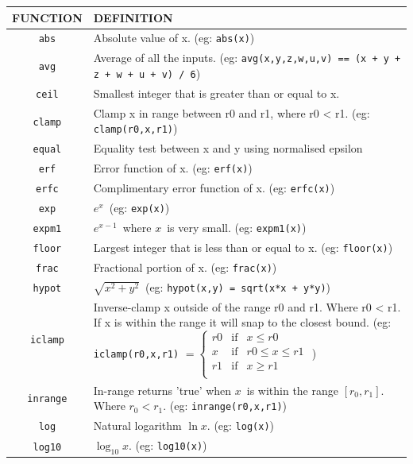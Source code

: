 \documentclass{book}
\begin{document}
{\newpage\clearpage
{}%
\begin{tabular}{|c|p{}|}
\hline
FUNCTION & DEFINITION\\
\hline
\verb'abs'& Absolute value of x.  (eg: \verb'abs(x)')\\
\verb'avg'& Average of all the inputs. (eg: \verb'avg(x,y,z,w,u,v) == (x + y + z + w + u + v) / 6')\\
\verb'ceil'& Smallest integer that is greater than or equal to x.\\
\verb'clamp'& Clamp x in range between r0 and r1, where r0 < r1. (eg:
\verb'clamp(r0,x,r1)')\\
\verb'equal'& Equality test between x and y using normalised epsilon\\
\verb'erf'& Error function of x.  (eg: \verb'erf(x)')\\
\verb'erfc'& Complimentary error function of x.  (eg: \verb'erfc(x)')\\
\verb'exp'& $e^x$\   (eg: \verb'exp(x)')\\
\verb'expm1'& $e^{x-1}$\  where $x$\  is very small. (eg: \verb'expm1(x)')\\
\verb'floor'& Largest integer that is less than or equal to x. (eg: \verb'floor(x)')\\
\verb'frac'& Fractional portion of x.  (eg: \verb'frac(x)')\\
\verb'hypot'& $\sqrt{x^2+y^2}$\  (eg: \verb'hypot(x,y) = sqrt(x*x + y*y)')\\
\verb'iclamp'& Inverse-clamp x outside of the range r0 and r1. Where
r0 < r1. If x is within the range it will snap to the closest
bound. (eg: \verb'iclamp(r0,x,r1)'
\begin{math}
=\left\{\begin{array}{ccc}
r0 & \mathrm{if} & x\le r0\\
x & \mathrm{if} & r0\le x \le r1\\
r1 & \mathrm{if} & x\ge r1\\
\end{array}\right.
\end{math}
)\\
\verb'inrange'&  In-range returns 'true' when $x$\  is within the range $[r_0,r_1]$. Where $r_0 < r_1$.  (eg: \verb'inrange(r0,x,r1)')\\
\verb'log'& Natural logarithm $\ln x$.  (eg: \verb'log(x)')\\
\verb'log10'& $\log_{10}x$.  (eg: \verb'log10(x)')\\

\end{tabular}}
\end{document}
